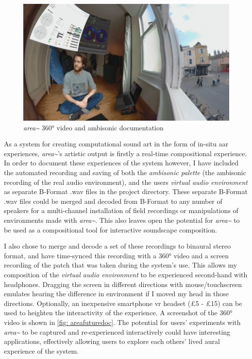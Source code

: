 \begin{figure}
    \centering
    \includegraphics[width=0.75\linewidth]{figures/05-area/areafuturedoc.png}
    \caption{\textit{area\textasciitilde{}} 360° video and ambisonic documentation \citep[from][]{bilbow2020a}}
    \label{fig: areafuturedoc}
\end{figure}
As a system for creating computational sound \gls{art} in the form of in-situ \gls{aar} experiences, \textit{area\textasciitilde{}}'s artistic output is firstly a real-time compositional experience. In order to document these experiences of the system however, I have included the automated recording and saving of both the \textit{ambisonic palette} (the ambisonic recording of the real audio environment), and the users \textit{virtual audio environment} as separate B-Format .wav files in the project directory. These separate B-Format .wav files could be merged and decoded from B-Format to any number of speakers for a multi-channel installation of field recordings or manipulations of environments made with \textit{area\textasciitilde{}}. This also leaves open the potential for \textit{area\textasciitilde{}} to be used as a compositional tool for interactive soundscape composition.

I also chose to merge and decode a set of these recordings to binaural stereo format, and have time-synced this recording with a 360° video and a screen recording of the patch that was taken during the system's use. This allows my composition of the \textit{virtual audio environment} to be experienced second-hand with headphones. Dragging the screen in different directions with mouse/touchscreen emulates hearing the difference in environment if I moved my head in those directions. Optionally, an inexpensive smartphone \gls{vr} headset (\pounds5 - \pounds15) can be used to heighten the interactivity of the experience. A screenshot of the 360° video \citep{bilbow2020} is shown in \autoref{fig: areafuturedoc}. The potential for users' experiments with \textit{area\textasciitilde{}} to be captured and re-experienced interactively could have interesting applications, effectively allowing users to explore each others' lived aural experience of the system.



